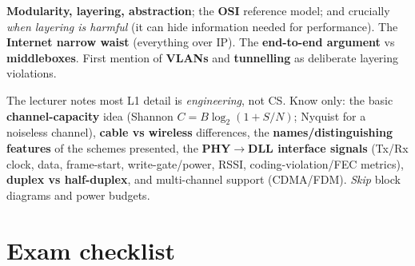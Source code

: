 \documentclass[11pt,a4paper]{article}
\begin{document}
\begin{useful}[title=Architecture \& philosophy]
\textbf{Modularity, layering, abstraction}; the \textbf{OSI} reference model; and crucially \emph{when layering is harmful} (it can hide information needed for performance). The \textbf{Internet narrow waist} (everything over IP). The \textbf{end-to-end argument} vs \textbf{middleboxes}. First mention of \textbf{VLANs} and \textbf{tunnelling} as deliberate layering violations.
\end{useful}

\begin{useful}[title=Physical layer (Tier 3 --- minimal for CS)]
The lecturer notes most L1 detail is \emph{engineering}, not CS. Know only: the basic \textbf{channel-capacity} idea (Shannon $C=B\log_2(1+S/N)$; Nyquist for a noiseless channel), \textbf{cable vs wireless} differences, the \textbf{names/distinguishing features} of the schemes presented, the \textbf{PHY$\to$DLL interface signals} (Tx/Rx clock, data, frame-start, write-gate/power, RSSI, coding-violation/FEC metrics), \textbf{duplex vs half-duplex}, and multi-channel support (CDMA/FDM). \emph{Skip} block diagrams and power budgets.
\end{useful}

\section*{Exam checklist}
\end{document}
